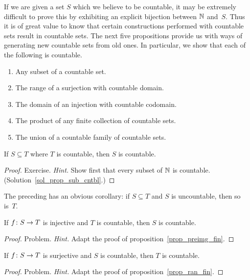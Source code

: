 If we are given a set $S$ which we believe to be countable, it may be extremely difficult to
prove this by exhibiting an explicit bijection between $\mathbb{N}$ and~$S$.  Thus it is of great
value to know that certain constructions performed with countable sets result in countable
sets.  The next five propositions provide us with ways of generating new countable sets from
old ones.  In particular, we show that each of the following is countable.
 \begin{enumerate}
  \item Any subset of a countable set.
  \item The range of a surjection with countable domain.
  \item The domain of an injection with countable codomain.
  \item The product of any finite collection of countable sets.
  \item The union of a countable family of countable sets.
 \end{enumerate}

\begin{prop}\label{prop_sub_cntbl}  If $S \subseteq T$ where $T$ is countable, then $S$ is countable.
\end{prop}

\begin{proof} Exercise. \emph{Hint.} Show first that every subset of $\mathbb{N}$ is countable.
(Solution~\ref{sol_prop_sub_cntbl}.)   \ns
\end{proof}

The preceding has an obvious corollary: if $S \subseteq T$ and $S$ is uncountable, then so
is~$T$.

\begin{prop}\label{prop_preimg_cntbl} If $f \colon S \rightarrow T$ is injective and $T$ is countable,
then $S$ is countable.
\end{prop}

\begin{proof} Problem.  \emph{Hint.}  Adapt the proof of proposition~\ref{prop_preimg_fin}.  \ns
\end{proof}

\begin{prop}\label{prop_ran_cntbl}  If $f \colon S \rightarrow T$ is surjective and $S$ is countable,
then $T$ is countable.
\end{prop}

\begin{proof} Problem.  \emph{Hint.}  Adapt the proof of proposition~\ref{prop_ran_fin}.  \ns
\end{proof}

